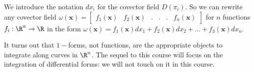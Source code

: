 \documentclass{ximera}
\begin{document}
	We introduce the notation $dx_i$ for the covector field $D(\pi_i)$.  So we can rewrite any covector field 
	$\omega(\mathbf{x}) = \begin{bmatrix} f_1(\mathbf{x}) &  f_2(\mathbf{x}) & .& .& .&  f_n(\mathbf{x})  \end{bmatrix}$ for $n$ functions $f_i:\R^n \to \R$
	in the form $\omega(\mathbf{x}) = f_1(\mathbf{x})dx_1+f_2(\mathbf{x})dx_2+...+f_3(\mathbf{x})dx_n$.
	
	It turns out that $1-$forms, not functions, are the appropriate objects to integrate along curves in $\R^n$. 
	The sequel to this course will focus on the integration of differential forms:  we will not touch on it in this course.
\end{document}
